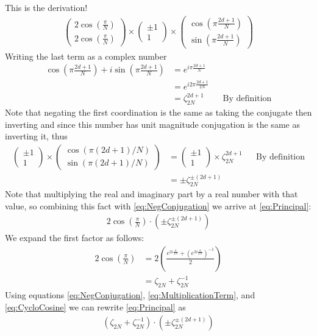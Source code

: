 \documentclass{article}
\begin{document}
This is the derivation!
\begin{align}
	\begin{pmatrix}
		2\cos\left(\frac{\pi}{N}\right) \\
		2\cos\left(\frac{\pi}{N}\right)
	\end{pmatrix}
	\times
	\begin{pmatrix}
		\pm 1 \\
		1
	\end{pmatrix}
	\times
	\begin{pmatrix}
		\cos\left(\pi\textstyle\frac{2d+1}{N}\right) \\
		\sin\left(\pi\textstyle\frac{2d+1}{N}\right)
	\end{pmatrix}
	\label{eq:Principal}
\end{align}
Writing the last term as a complex number 
\begin{align}
	\cos\left(\pi\frac{2d+1}{N}\right) + 
	i\sin\left(\pi\frac{2d+1}{N}\right)
	&= e^{i\pi\frac{2d+1}{N}}  \nonumber\\
	&=e^{i2\pi\frac{2d+1}{2N}} \nonumber\\
	&=\zeta_{2N}^{2d + 1} && \text{By definition}
\end{align}
Note that negating the first coordination is the same as taking the conjugate then inverting and since this number has unit magnitude conjugation is the same as inverting it, thus
\begin{align}
	\begin{pmatrix}
		\pm 1 \\
		1
	\end{pmatrix}
	\times
	\begin{pmatrix}
		\cos(\pi(2d+1)/N) \\
		\sin(\pi(2d+1)/N)
	\end{pmatrix}
	&= 
	\begin{pmatrix}
		\pm 1 \\
		1
	\end{pmatrix}
	\times
	\zeta_{2N}^{2d + 1} && \text{By definition}\nonumber \\
	&= \pm\zeta_{2N}^{\pm (2d + 1)}
	\label{eq:NegConjugation}
\end{align}
Note that multiplying the real and imaginary part by a real number with that value, so combining this fact with \eqref{eq:NegConjugation} we arrive at \eqref{eq:Principal}:
\begin{align}
	2\cos\left(\frac{\pi}{N}\right)\cdot\left(\pm\zeta_{2N}^{\pm (2d + 1)}\right)
	\label{eq:MultiplicationTerm}
\end{align}
We expand the first factor as follows:
\begin{align}
	2\cos\left(\frac{\pi}{N}\right) &= 2\left(\frac{e^{2i\frac{\pi}{2N}} + \left(e^{2i\frac{\pi}{2N}}\right)^{-1}}{2}\right) \nonumber
	\\ &=\zeta_{2N} + \zeta_{2N}^{-1} \label{eq:CycloCosine}
\end{align}
Using equations \eqref{eq:NegConjugation}, \eqref{eq:MultiplicationTerm}, and \eqref{eq:CycloCosine} we can rewrite \eqref{eq:Principal} as 
\begin{align}
	\left(\zeta_{2N} + \zeta_{2N}^{-1}\right)\cdot\left(\pm\zeta_{2N}^{\pm (2d + 1)}\right)
\end{align}
\end{document}
